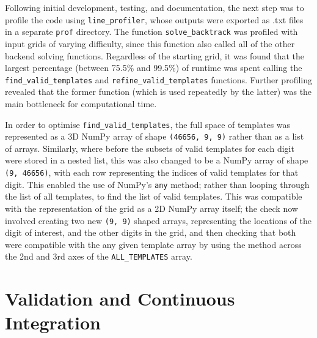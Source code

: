 \documentclass[12pt]{article}
\begin{document}
Following initial development, testing, and documentation, the next step was to profile the code using \texttt{line\_profiler}, whose outputs were exported as .txt files in a separate \texttt{prof} directory.
The function \texttt{solve\_backtrack} was profiled with input grids of varying difficulty, since this function also called all of the other backend solving functions.
Regardless of the starting grid, it was found that the largest percentage (between 75.5\% and 99.5\%) of runtime was spent calling the \texttt{find\_valid\_templates} and \texttt{refine\_valid\_templates} functions.
Further profiling revealed that the former function (which is used repeatedly by the latter) was the main bottleneck for computational time.

In order to optimise \texttt{find\_valid\_templates}, the full space of templates was represented as a 3D NumPy array of shape \texttt{(46656, 9, 9)} rather than as a list of arrays.
Similarly, where before the subsets of valid templates for each digit were stored in a nested list, this was also changed to be a NumPy array of shape \texttt{(9, 46656)}, with each row representing the indices of valid templates for that digit.
This enabled the use of NumPy's \texttt{any} method; rather than looping through the list of all templates, to find the list of valid templates.
This was compatible with the representation of the grid as a 2D NumPy array itself; the check now involved creating two new \texttt{(9, 9)} shaped arrays, representing the locations of the digit of interest, and the other digits in the grid, and then checking that both were compatible with the any given template array by using the  method across the 2nd and 3rd axes of the \texttt{ALL\_TEMPLATES} array.

\section{Validation and Continuous Integration}
\end{document}
